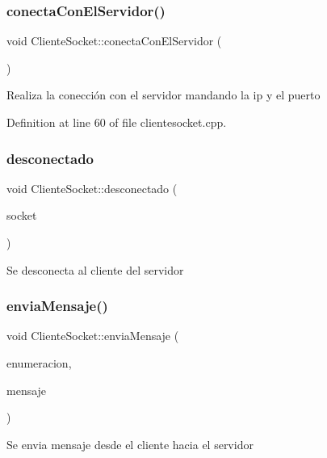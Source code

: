 \subsubsection{\texorpdfstring{conecta\+Con\+El\+Servidor()}{conectaConElServidor()}}
{\footnotesize\ttfamily void Cliente\+Socket\+::conecta\+Con\+El\+Servidor (\begin{DoxyParamCaption}{ }\end{DoxyParamCaption})}

Realiza la conección con el servidor mandando la ip y el puerto 

Definition at line 60 of file clientesocket.\+cpp.

\mbox{\label{class_cliente_socket_a9b3fe9b9c512e91b90c8aa86b4ee14e9}} 
\subsubsection{\texorpdfstring{desconectado}{desconectado}}
{\footnotesize\ttfamily void Cliente\+Socket\+::desconectado (\begin{DoxyParamCaption}\item[{\hyperlink{class_cliente_socket}{Cliente\+Socket} $\ast$}]{socket }\end{DoxyParamCaption})\hspace{0.3cm}{\ttfamily [signal]}}

Se desconecta al cliente del servidor \mbox{\label{class_cliente_socket_ad176a3962afc92f60da91d2526bcf569}} 
\subsubsection{\texorpdfstring{envia\+Mensaje()}{enviaMensaje()}}
{\footnotesize\ttfamily void Cliente\+Socket\+::envia\+Mensaje (\begin{DoxyParamCaption}\item[{int}]{enumeracion,  }\item[{const Q\+String \&}]{mensaje }\end{DoxyParamCaption})}

Se envia mensaje desde el cliente hacia el servidor 

